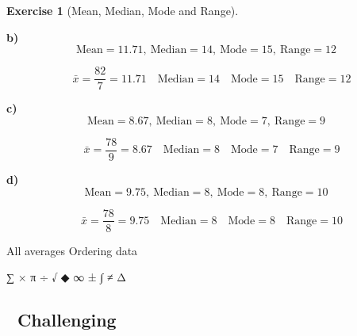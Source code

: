\documentclass[
  letterpaper,
  DIV=11,
  numbers=noendperiod]{scrreprt}
\theoremstyle{definition}
\newtheorem{exercise}{Exercise}[chapter]
\theoremstyle{remark}
\begin{document}
\begin{exercise}[Mean, Median, Mode and
Range]
\begin{tcolorbox}
\textbf{b)}
\[\text{Mean}=11.71,\ \text{Median}=14,\ \text{Mode}=15,\ \text{Range}=12\]

\[\quad \bar{x}=\frac{82}{7}=11.71\quad \text{Median}=14\quad \text{Mode}=15\quad \text{Range}=12\]

\textbf{c)}
\[\text{Mean}=8.67,\ \text{Median}=8,\ \text{Mode}=7,\ \text{Range}=9\]

\[\quad \bar{x}=\frac{78}{9}=8.67\quad \text{Median}=8\quad \text{Mode}=7\quad \text{Range}=9\]

\textbf{d)}
\[\text{Mean}=9.75,\ \text{Median}=8,\ \text{Mode}=8,\ \text{Range}=10\]

\[\quad \bar{x}=\frac{78}{8}=9.75\quad \text{Median}=8\quad \text{Mode}=8\quad \text{Range}=10\]

\end{tcolorbox}

{All averages} {Ordering data}

\end{exercise}

∑ × π ÷ √ ◆ ∞ ± ∫ ≠ Δ

\subsection{🔴 Challenging}
\end{document}
